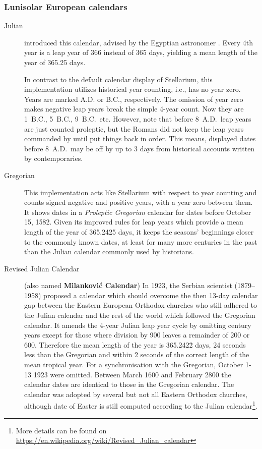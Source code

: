 \subsubsection{Lunisolar European calendars}
\begin{description}
\item[Julian]  introduced this calendar, advised
  by the Egyptian astronomer . Every 4th year is a
  leap year of 366 instead of 365 days, yielding a mean length of the
  year of 365.25 days.

  In contrast to the default calendar display of Stellarium, this
  implementation utilizes historical year counting, i.e., has no year
  zero. Years are marked A.D. or B.C., respectively.  The omission of
  year zero makes negative leap years break the simple 4-year
  count. Now they are 1~B.C., 5~B.C., 9~B.C.\ etc. However, note that
  before 8~A.D.\ leap years are just counted proleptic, but the Romans
  did not keep the leap years commanded by  until
   put things back in order. This means, displayed
  dates before 8~A.D.\ may be off by up to 3 days from historical
  accounts written by contemporaries.
\item[Gregorian] This implementation acts like Stellarium with respect
  to year counting and counts signed negative and positive years, with a year
  zero between them. It shows dates in a \emph{Proleptic Gregorian}
  calendar for dates before October 15, 1582. Given its improved rules
  for leap years which provide a mean length of the year of 365.2425 days,
  it keeps the seasons' beginnings closer to the
  commonly known dates, at least for many more centuries in the past
  than the Julian calendar commonly used by historians.
\item[Revised Julian Calendar] (also named \textbf{Milankovi\'c
  Calendar}) In 1923, the Serbian scientist
   (1879--1958) proposed a calendar which
  should overcome the then 13-day calendar gap between the Eastern
  European Orthodox churches who still adhered to the Julian calendar
  and the rest of the world which followed the Gregorian calendar.  It
  amends the 4-year Julian leap year cycle by omitting century years
  except for those where division by 900 leaves a remainder of 200 or
  600.  Therefore the mean length of the year is 365.242\={2} days, 24
  seconds less than the Gregorian and within 2 seconds of the correct
  length of the mean tropical year.  For a synchronisation with the
  Gregorian, October 1-13 1923 were omitted.  Between March 1600 and
  February 2800 the calendar dates are identical to those in the
  Gregorian calendar.  The calendar was adopted by several but not all
  Eastern Orthodox churches, although date of Easter is still computed
  according to the Julian calendar\footnote{More details can be found on
    \url{https://en.wikipedia.org/wiki/Revised_Julian_calendar}}.


\end{description}
